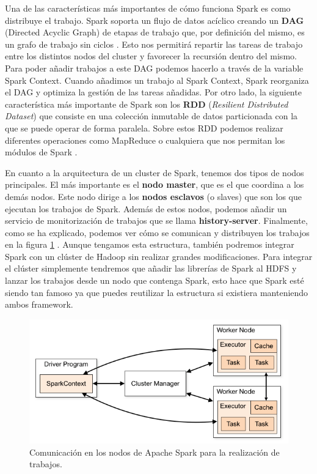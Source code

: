 Una de las características más importantes de cómo funciona Spark es como
distribuye el trabajo. Spark soporta un flujo de datos acíclico creando un
\textbf{DAG} (Directed Acyclic Graph) de etapas de trabajo que, por
definición del mismo, es un grafo de trabajo sin ciclos \cite{Spk-5}. Esto
nos permitirá repartir las tareas de trabajo entre los distintos nodos del
cluster y favorecer la recursión dentro del mismo. Para poder añadir
trabajos a este DAG podemos hacerlo a través de la variable Spark Context.
Cuando añadimos un trabajo al Spark Context, Spark reorganiza el DAG y
optimiza la gestión de las tareas añadidas. Por otro lado, la siguiente
característica más importante de Spark son los \textbf{RDD} ({\em Resilient
  Distributed Dataset}) que consiste en una colección inmutable de datos
particionada con la que se puede operar de forma paralela. Sobre estos RDD
podemos realizar diferentes operaciones como MapReduce o cualquiera que nos
permitan los módulos de Spark \cite{Spk-4}.

En cuanto a la arquitectura de un cluster de Spark, tenemos dos tipos de
nodos principales. El más importante es el \textbf{nodo master}, que es el
que coordina a los demás nodos. Este nodo dirige a los \textbf{nodos
  esclavos} (o slaves) que son los que ejecutan los trabajos de Spark.
Además de estos nodos, podemos añadir un servicio de monitorización de
trabajos que se llama \textbf{history-server}. Finalmente, como se ha
explicado, podemos ver cómo se comunican y distribuyen los trabajos en la
figura \ref{SpkImg-1} \cite{Spk-6}. Aunque tengamos esta estructura,
también podremos integrar Spark con un clúster de Hadoop sin realizar
grandes modificaciones. Para integrar el clúster simplemente tendremos que
añadir las librerías de Spark al HDFS y lanzar los trabajos desde un nodo
que contenga Spark, esto hace que Spark esté siendo tan famoso ya que
puedes reutilizar la estructura si existiera manteniendo ambos framework.

\begin{figure}[htp]
\centering
\includegraphics[scale=0.65]{Imagenes/spark1.png}
\caption{Comunicación en los nodos de Apache Spark para la realización de
  trabajos.}
\label{SpkImg-1}
\end{figure}

